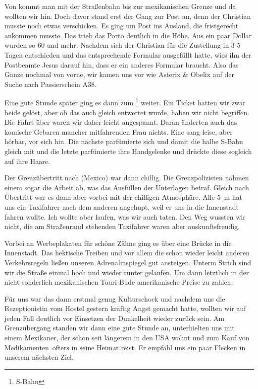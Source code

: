Von  kommt man mit der Straßenbahn bis zur mexikanischen Grenze und da wollten wir hin.
Doch davor stand erst der Gang zur Post an, denn der Christian musste noch etwas verschicken.
Es ging um Post ins Ausland, die fristgerecht ankommen musste.
Das trieb das Porto deutlich in die Höhe.
Aus ein paar Dollar wurden so 60 und mehr.
Nachdem sich der Christian für die Zustellung in 3-5 Tagen entschieden und das entsprechende Formular ausgefüllt hatte, wies ihn der Postbeamte Jesus darauf hin, dass er ein anderes Formular braucht.
Also das Ganze nochmal von vorne, wir kamen uns vor wie Asterix \& Obelix auf der Suche nach Passierschein A38.

Eine gute Stunde später ging es dann zum \footnote{S-Bahn} weiter.
Ein Ticket hatten wir zwar beide gelöst, aber ob das auch gleich entwertet wurde, haben wir nicht begriffen.
Die Fahrt über waren wir daher leicht angespannt.
Daran änderten auch das komische Gebaren mancher mitfahrenden Frau nichts.
Eine sang leise, aber hörbar, vor sich hin.
Die nächste par\-fü\-mierte sich und damit die halbe S-Bahn gleich mit und die letzte par\-fü\-mierte ihre Handgelenke und drückte diese sogleich auf ihre Haare.

Der Grenzübertritt nach  (Mexico) war dann chillig.
Die Grenzpolizisten nahmen einem sogar die Arbeit ab, was das Ausfüllen der Unterlagen betraf.
Gleich nach Übertritt war es dann aber vorbei mit der chilligen Atmosphäre.
Alle 5~m hat uns ein Taxifahrer nach dem anderen angehupt, weil er uns in die Innenstadt fahren wollte.
Ich wollte aber laufen, was wir auch taten.
Den Weg wussten wir nicht, die am Straßenrand stehenden Taxifahrer waren aber auskunftsfreudig.

Vorbei an Werbeplakaten für schöne Zähne ging es über eine Brücke in die Innenstadt.
Das hektische Treiben und vor allem die schon wieder leicht anderen Verkehrsregeln ließen unseren Adrenalinspiegel gut ansteigen.
Unterm Strich sind wir die Straße einmal hoch und wieder runter gelaufen.
Um dann letztlich in der nicht sonderlich mexikanischen Touri-Bude amerikanische Preise zu zahlen.

Für uns war das dann erstmal genug Kulturschock und nachdem uns die Rezeptionistin vom Hostel gestern kräftig Angst gemacht hatte, wollten wir auf jeden Fall deutlich vor Einsetzen der Dunkelheit wieder zurück sein.
Am Grenzübergang standen wir dann eine gute Stunde an, unterhielten uns mit einem Mexikaner, der schon seit längerem in den USA wohnt und zum Kauf von \glqq Medikamenten\grqq \, öfters in seine Heimat reist.
Er empfahl uns ein paar Flecken in  unserem nächsten Ziel.
